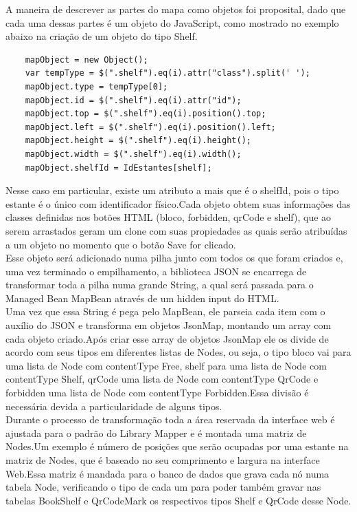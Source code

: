 \documentclass[a4paper,10pt]{article}
\begin{document}
	A maneira de descrever as partes do mapa como objetos foi proposital, dado que cada uma dessas partes é um objeto do JavaScript, como
	mostrado no exemplo abaixo na criação de um objeto do tipo Shelf.
      \begin{lstlisting}	
	mapObject = new Object();
	var tempType = $(".shelf").eq(i).attr("class").split(' ');
	mapObject.type = tempType[0]; 
	mapObject.id = $(".shelf").eq(i).attr("id");
	mapObject.top = $(".shelf").eq(i).position().top;
	mapObject.left = $(".shelf").eq(i).position().left;
	mapObject.height = $(".shelf").eq(i).height();
	mapObject.width = $(".shelf").eq(i).width();
	mapObject.shelfId = IdEstantes[shelf]; 
      \end{lstlisting}					

	Nesse caso em particular, existe um atributo a mais que é o shelfId, pois o tipo estante é o único com identificador físico.Cada objeto
	obtem suas informações das classes definidas nos botões HTML (bloco, forbidden, qrCode e shelf), que ao serem arrastados geram
	um clone com suas propiedades as quais serão atribuídas a um objeto no momento que o botão Save for clicado.\\

	Esse objeto será adicionado numa pilha junto com todos os que foram criados e, uma vez terminado o empilhamento, a biblioteca JSON se encarrega
	de transformar toda a pilha numa grande String, a qual será passada para o Managed Bean MapBean através de um hidden input do HTML.\\

	Uma vez que essa String é pega pelo MapBean, ele parseia cada item com o auxílio do JSON e transforma em objetos JsonMap, montando um 
	array com cada objeto criado.Após criar esse array de objetos JsonMap ele os divide de acordo com seus tipos em diferentes listas de Nodes,
	ou seja, o tipo bloco vai para uma lista de Node com contentType Free, shelf para uma lista de Node com contentType Shelf, qrCode uma lista 
	de Node com contentType	QrCode e forbidden uma lista de Node com contentType Forbidden.Essa divisão é necessária devida a particularidade de alguns tipos.\\ 

	Durante o processo de transformação toda a área reservada da interface web é ajustada para o padrão do Library Mapper 
	e é montada uma matriz de Nodes.Um exemplo é número de posições que serão ocupadas por uma estante na matriz de Nodes, que é baseado no seu comprimento 
	e largura na interface Web.Essa matriz é mandada para o banco de dados que 
	grava cada nó numa tabela Node, verificando o tipo de cada um para poder também gravar nas tabelas BookShelf e QrCodeMark os respectivos
	tipos Shelf e QrCode desse Node. \\
	
\end{document}
